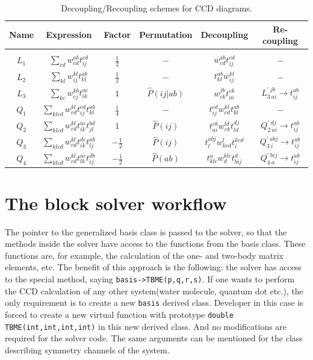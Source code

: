 \documentclass[twoside,english]{uiofysmaster}
\newcommand{\classname}[1]{\texttt{#1}}
\begin{document}
\begin{table}[h!]
	\caption{ Decoupling/Recoupling schemes for CCD diagrams.}
	\label{tab:recoupling}
	\begin{center}
		\begin{tabular}{cccccc}
			
			\hline
			\hline
			Name & Expression & Factor & Permutation & Decoupling & Re-coupling  \\
			\hline\\
			$  L_1 	  $  & $\sum\limits_{cd}w_{cd}^{ab}t_{ij}^{cd} $ & $  \frac{1}{2}$ &$  - $  & $w_{cd}^{ab}t_{ij}^{cd}  $ & $  -$  \\
			$  L_2    $  & $\sum\limits_{kl}w_{ij}^{kl}t_{kl}^{ab} $ & $  \frac{1}{2}$ &$  -  $  & $t_{kl}^{ab}w_{ij}^{kl}  $ & $  -$  \\
			$  L_3    $  & $\sum\limits_{kc}w_{cj}^{kb}t_{ik}^{ac} $ & $ 1 $ &$ \hat{P}(ij|ab)   $  & $ w_{ck}^{jb}t_{ai}^{ck} $ & $ L_{3\ ai}^{\prime\ jb} \rightarrow t_{ij}^{ab}$  \\
			$  Q_1    $  & $\sum\limits_{klcd}w_{cd}^{kl}t_{ij}^{cd}t_{kl}^{ab}  $ & $  \frac{1}{4}$ &$  -  $  & $t_{ij}^{cd}w_{cd}^{kl}t_{kl}^{ab} $ & $  -$  \\
			$  Q_2    $  & $\sum\limits_{klcd}w_{cd}^{kl}t_{ik}^{ac}t_{jl}^{bd} $ & $  1$ &$  \hat{P}(ij)  $  & $t_{ai}^{ck}w_{ck}^{ld}t_{ld}^{dj} $ & $  Q_{2\ ai}^{\prime\ dj} \rightarrow t_{ij}^{ab}$  \\
			$  Q_3    $  & $\sum\limits_{klcd}w_{cd}^{kl}t_{ik}^{dc}t_{lj}^{ab} $ & $  - \frac{1}{2}$ &$  \hat{P}(ij)  $  & $   t_{l}^{abj} w_{kcd}^{l}   t_{i}^{kcd}$ & $  Q_{3\ i}^{\prime\ abj} \rightarrow t_{ij}^{ab}$  \\
			$  Q_4    $  & $\sum\limits_{klcd}w_{cd}^{kl}t_{lk}^{ac}t_{ij}^{db} $ & $ - \frac{1}{2}$ &$ \hat{P}(ab)   $  & $t_{klc}^{a}   w_{d}^{klc}   t_{bij}^{d} $ & $ Q_{4\ a}^{\prime \ bij} \rightarrow t_{ij}^{ab}$  \\
		\end{tabular}
	\end{center}
\end{table}


\section{The block solver workflow}\label{blocksolvwf}
The pointer to the generalized basis class is passed to the solver, so that the methods inside the solver have access to the functions from the basis class. These functions are, for example, the calculation of the one- and two-body matrix elements, etc.
The benefit of this approach is the following: the solver has access to the special method, saying \classname{basis->TBME(p,q,r,s)}. If one wants to perform the CCD calculation of any other system(water molecule, quantum dot etc.), the only requirement is to create a new \classname{basis} derived class. Developer in this case is forced to create a new virtual function with prototype \classname{double TBME(int,int,int,int)} in this new derived class. And no modifications are required for the solver code. The same arguments can be mentioned for the class describing symmetry channels of the system.
\end{document}

